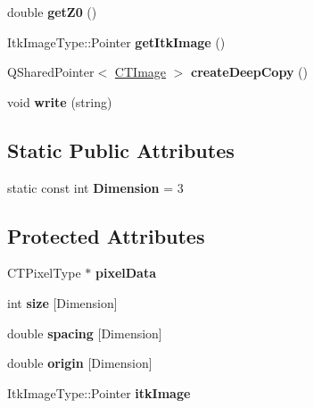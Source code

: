 \begin{DoxyCompactItemize}
\item 
\hypertarget{class_c_t_image_af9f4fbfeb1548ebf58ae681a74bb0b54}{
double {\bfseries getZ0} ()}
\label{class_c_t_image_af9f4fbfeb1548ebf58ae681a74bb0b54}

\item 
\hypertarget{class_c_t_image_a2266bfbf0ff3f1d4c04d6ae05f5eee69}{
ItkImageType::Pointer {\bfseries getItkImage} ()}
\label{class_c_t_image_a2266bfbf0ff3f1d4c04d6ae05f5eee69}

\item 
\hypertarget{class_c_t_image_a811c3f70d241cb7d43bcb872bf71a739}{
QSharedPointer$<$ \hyperlink{class_c_t_image}{CTImage} $>$ {\bfseries createDeepCopy} ()}
\label{class_c_t_image_a811c3f70d241cb7d43bcb872bf71a739}

\item 
\hypertarget{class_c_t_image_a331eca88c8ed19bb8417ab33027076fc}{
void {\bfseries write} (string)}
\label{class_c_t_image_a331eca88c8ed19bb8417ab33027076fc}

\end{DoxyCompactItemize}
\subsection*{Static Public Attributes}
\begin{DoxyCompactItemize}
\item 
\hypertarget{class_c_t_image_a34aa610a2249b7586a36c1d45e6cfca8}{
static const int {\bfseries Dimension} = 3}
\label{class_c_t_image_a34aa610a2249b7586a36c1d45e6cfca8}

\end{DoxyCompactItemize}
\subsection*{Protected Attributes}
\begin{DoxyCompactItemize}
\item 
\hypertarget{class_c_t_image_a29c83a17b8ea482d51450c00be31f7cb}{
CTPixelType $\ast$ {\bfseries pixelData}}
\label{class_c_t_image_a29c83a17b8ea482d51450c00be31f7cb}

\item 
\hypertarget{class_c_t_image_a9a5d2713d29fc74c6e058f2052699732}{
int {\bfseries size} \mbox{[}Dimension\mbox{]}}
\label{class_c_t_image_a9a5d2713d29fc74c6e058f2052699732}

\item 
\hypertarget{class_c_t_image_aa9a74a5c3f31c1bc62a127cdfad8401f}{
double {\bfseries spacing} \mbox{[}Dimension\mbox{]}}
\label{class_c_t_image_aa9a74a5c3f31c1bc62a127cdfad8401f}

\item 
\hypertarget{class_c_t_image_a28951b7646597ce9c1104738a06fb610}{
double {\bfseries origin} \mbox{[}Dimension\mbox{]}}
\label{class_c_t_image_a28951b7646597ce9c1104738a06fb610}

\item 
\hypertarget{class_c_t_image_a91c32385b0076c38b0729f237b4e88f3}{
ItkImageType::Pointer {\bfseries itkImage}}
\label{class_c_t_image_a91c32385b0076c38b0729f237b4e88f3}

\end{DoxyCompactItemize}
